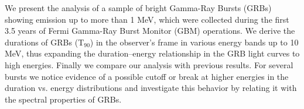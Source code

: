 


\bigskip



\bigskip

\noindent We present the analysis of a sample of bright Gamma-Ray Bursts (GRBs) showing emission up to more than 1 MeV, which were collected during the first 3.5 years of Fermi Gamma-Ray Burst Monitor (GBM) operations.
We derive the durations of GRBs (T$_{90}$) in the observer's frame in various energy bands up to 10 MeV, thus expanding the duration–energy relationship in the GRB light curves to high energies. Finally we compare our analysis with previous results.
For several bursts we notice evidence of a possible cutoff or break at higher energies in the duration vs. energy distributions and investigate this
behavior by relating it with the spectral properties of GRBs.

